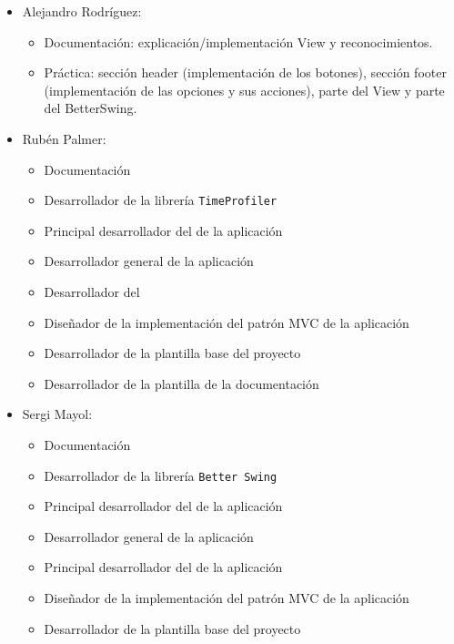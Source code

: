 \documentclass[12pt,journal,compsoc]{IEEEtran}
\begin{document}
\begin{itemize}
    \item Alejandro Rodríguez:
        \begin{itemize}
            \item Documentación: explicación/implementación View y reconocimientos. 
            \item Práctica: sección header (implementación de los botones), sección footer (implementación de las opciones y sus acciones), parte del View y parte del BetterSwing.
        \end{itemize}
    \item Rubén Palmer:
    \begin{itemize}
        \item Documentación
        \item Desarrollador de la librería \texttt{TimeProfiler}
        \item Principal desarrollador del  de la aplicación
        \item Desarrollador general de la aplicación
        \item Desarrollador del 
        \item Diseñador de la implementación del patrón MVC de la aplicación
        \item Desarrollador de la plantilla base del proyecto
        \item Desarrollador de la plantilla de la documentación 
    \end{itemize}
    \item Sergi Mayol:
    \begin{itemize}
        \item Documentación
        \item Desarrollador de la librería \texttt{Better Swing}
        \item Principal desarrollador del  de la aplicación
        \item Desarrollador general de la aplicación
        \item Principal desarrollador del  de la aplicación
        \item Diseñador de la implementación del patrón MVC de la aplicación
        \item Desarrollador de la plantilla base del proyecto
    \end{itemize}
\end{itemize}
\end{document}

